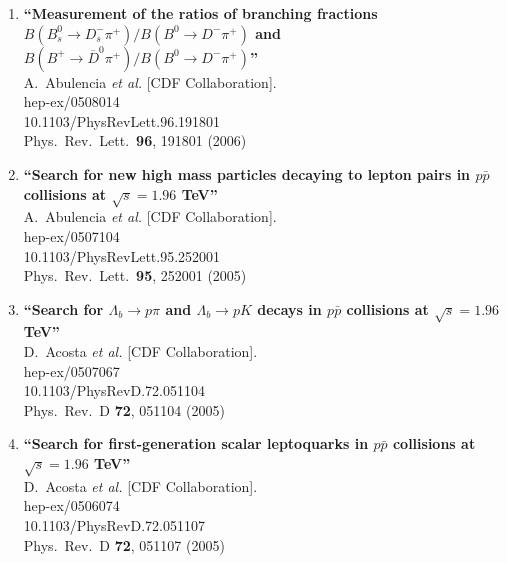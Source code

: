 \documentclass{article}
\begin{document}
\begin{enumerate}
\item%
{\bf ``Measurement of the ratios of branching fractions $B(B_s^0 \to D_s^- \pi^+)/B(B^0 \to D^- \pi^+)$ and $B(B^+ \to \overline{D}^0 \pi^+)/B(B^0 \to D^- \pi^+)$''}
  \\{}A.~Abulencia {\it et al.}  [CDF Collaboration].
  \\{}hep-ex/0508014
    \\{}10.1103/PhysRevLett.96.191801
\\{}Phys.\ Rev.\ Lett.\  {\bf 96}, 191801 (2006) %


\item%
{\bf ``Search for new high mass particles decaying to lepton pairs in $p\bar{p}$ collisions at $\sqrt{s} = 1.96$ TeV''}
  \\{}A.~Abulencia {\it et al.}  [CDF Collaboration].
  \\{}hep-ex/0507104
    \\{}10.1103/PhysRevLett.95.252001
\\{}Phys.\ Rev.\ Lett.\  {\bf 95}, 252001 (2005) %


\item%
{\bf ``Search for $\Lambda_b \to p \pi$ and $\Lambda_b \to p K$ decays in $p\bar{p}$ collisions at $\sqrt{s} = 1.96$ TeV''}
  \\{}D.~Acosta {\it et al.}  [CDF Collaboration].
  \\{}hep-ex/0507067
    \\{}10.1103/PhysRevD.72.051104
\\{}Phys.\ Rev.\ D {\bf 72}, 051104 (2005) %


\item%
{\bf ``Search for first-generation scalar leptoquarks in $p\bar{p}$ collisions at $\sqrt{s} = 1.96$ TeV''}
  \\{}D.~Acosta {\it et al.}  [CDF Collaboration].
  \\{}hep-ex/0506074
    \\{}10.1103/PhysRevD.72.051107
\\{}Phys.\ Rev.\ D {\bf 72}, 051107 (2005) %



\end{enumerate}
\end{document}
